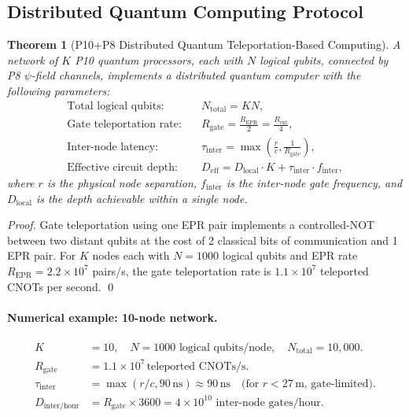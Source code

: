 \documentclass[11pt]{article}
\newtheorem{theorem}{Theorem}[section]
\theoremstyle{definition}
\theoremstyle{remark}
\begin{document}
\subsection{Distributed Quantum Computing Protocol}

\begin{theorem}[P10+P8 Distributed Quantum Teleportation-Based Computing]
\label{thm:distributed_qc}
A network of $K$ P10 quantum processors, each with $N$ logical qubits,
connected by P8 $\psi$-field channels, implements a distributed quantum
computer with the following parameters:
\begin{align}
\text{Total logical qubits:}&\quad N_{\mathrm{total}} = KN, \label{eq:total_qubits} \\
\text{Gate teleportation rate:}&\quad R_{\mathrm{gate}} = \frac{R_{\mathrm{EPR}}}{2}
= \frac{R_{\mathrm{ent}}}{4}, \label{eq:gate_rate} \\
\text{Inter-node latency:}&\quad \tau_{\mathrm{inter}} = \max\!\left(\frac{r}{c}, \frac{1}{R_{\mathrm{gate}}}\right), \label{eq:latency} \\
\text{Effective circuit depth:}&\quad D_{\mathrm{eff}} = D_{\mathrm{local}}\cdot K
+ \tau_{\mathrm{inter}}\cdot f_{\mathrm{inter}}, \label{eq:eff_depth}
\end{align}
where $r$ is the physical node separation, $f_{\mathrm{inter}}$ is the
inter-node gate frequency, and $D_{\mathrm{local}}$ is the depth achievable
within a single node.
\end{theorem}

\begin{proof}
Gate teleportation using one EPR pair implements a controlled-NOT between
two distant qubits at the cost of 2 classical bits of communication and
1 EPR pair. For $K$ nodes each with $N = 1000$ logical qubits and EPR
rate $R_{\mathrm{EPR}} = 2.2\times10^7$ pairs/s, the gate teleportation
rate is $1.1\times10^7$ teleported CNOTs per second. \qed
\end{proof}

\paragraph{Numerical example: 10-node network.}
\begin{align}
K &= 10,\quad N = 1000 \text{ logical qubits/node},\quad N_{\mathrm{total}} = 10{,}000. \\
R_{\mathrm{gate}} &= 1.1\times10^7\,\text{teleported CNOTs/s}. \\
\tau_{\mathrm{inter}} &= \max(r/c, 90\,\text{ns}) \approx 90\,\text{ns}
\quad\text{(for $r < 27\,\mathrm{m}$, gate-limited)}. \\
D_{\mathrm{inter/hour}} &= R_{\mathrm{gate}}\times3600 = 4\times10^{10}
\text{ inter-node gates/hour}.
\end{align}
\end{document}
